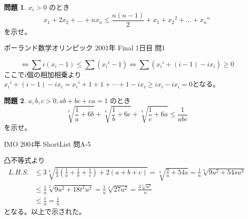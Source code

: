 \documentclass[uplatex, a5paper]{jsarticle}
\makeatletter
\theoremstyle{definition}
\newtheorem{prob}{問題}
\renewenvironment{proof}[1][\proofname]{
  \pushQED{\qed}%
  \normalfont \topsep6\p@\@plus6\p@\relax
  \trivlist
  \item[\hskip\labelsep
    #1\@addpunct{\textbf{.}}]\ignorespaces
}{%
  \popQED\endtrivlist\@endpefalse
}
\providecommand{\proofname}{証明}
\newcommand{\lhs }{ L.H.S. }
\def\qed{\hfill $\Box$}
\makeatother
\begin{document}
\newpage

\begin{prob}
  \(x_i > 0\)
  のとき
  \[
  x_1 + 2x_2 + \ldots + nx_n \leq \frac{n(n-1)}{2} + x_1 + {x_2}^2 + \ldots + {x_n}^n
  \]
  を示せ。
  \begin{flushright}
    ポーランド数学オリンピック 2001年 Final 1日目 問1
  \end{flushright}
\end{prob}


\begin{proof}
  \[
  \Leftrightarrow \sum i(x_i-1) \leq \sum ({x_i}^i-1)
  \Leftrightarrow \sum \left( {x_i}^i +(i-1) -ix_i \right) \geq 0
  \]
  ここで\(i\)個の相加相乗より
  \({x_i}^i +(i-1) -ix_i = {x_i}^i +1+1+\cdots +1-ix_i \geq ix_i-ix_i=0\)となる。
\end{proof}













\newpage

\begin{prob}
  \(a , b , c > 0 , ab+bc+ca = 1\)
  のとき
  \[
  \sqrt[3]{\frac{1}{a} + 6b} + \sqrt[3]{\frac{1}{b}+ 6c} + \sqrt[3]{\frac{1}{c} + 6a} \leq \frac{1}{abc}
  \]
  を示せ。
  \begin{flushright}
    IMO 2004年 ShortList 問A-5
  \end{flushright}
\end{prob}


\begin{proof}
  凸不等式より
  \begin{align*}
    \lhs &\leq 3\sqrt[3]{\frac{1}{3}\left( \frac{1}{a}+\frac{1}{b}+\frac{1}{c} \right) +2(a+b+c)}
    = \sqrt[3]{\frac{9}{u} + 54s}=\frac{1}{u}\sqrt[3]{9u^2+54su^3} \\
    &\leq \frac{1}{u}\sqrt[3]{9u^2 + 18t^2u^2} = \frac{1}{u}\sqrt[3]{27u^2}= \frac{3\sqrt[3]{u^2}}{u} \\
    &\leq \frac{t}{u} = \frac{1}{u}
  \end{align*}
  となる。以上で示された。
\end{proof}
\end{document}

